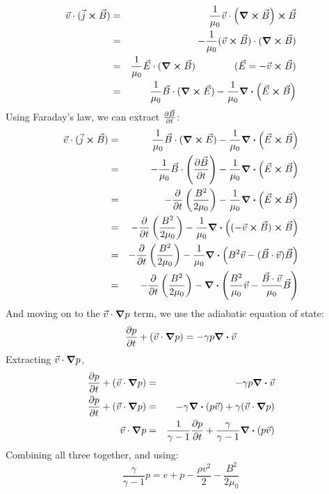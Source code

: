 \documentclass[%
 reprint,
 amsmath,amssymb,
 aps,
]{revtex4-2}
\begin{document}
\begin{eqnarray}
\vec v \cdot ( \vec j \cross \vec B) & = & \frac{1}{\mu_0}\vec v \cdot \left( \curl \vec B \right) \cross \vec B \\
& = & - \frac{1}{\mu_0}(\vec v \cross \vec B) \cdot (\curl \vec B) \\
& = & \frac{1}{\mu_0} \vec E \cdot (\curl \vec B) \qquad \qquad (\vec E = - \vec v \cross \vec B) \\
& = & \frac{1}{\mu_0} \vec B \cdot (\curl \vec E) - \frac{1}{\mu_0} \div (\vec E \cross \vec B)
\end{eqnarray}
Using Faraday's law, we can extract $\pdv{\vec B}{t}$:
\begin{eqnarray}
\vec v \cdot (\vec j \cross \vec B) & = & \frac{1}{\mu_0} \vec B \cdot (\curl \vec E) - \frac{1}{\mu_0} \div (\vec E \cross \vec B) \\
& = & - \frac{1}{\mu_0} \vec B \cdot \left(\pdv{\vec B}{t} \right) - \frac{1}{\mu_0} \div (\vec E \cross \vec B) \\
& = & - \pdv{}{t} \left( \frac{B^2}{2 \mu_0} \right) - \frac{1}{\mu_0} \div (\vec E \cross \vec B) \\
& = & - \pdv{}{t} \left( \frac{B^2}{2 \mu_0} \right) - \frac{1}{\mu_0}\div \left( (- \vec v \cross \vec B) \cross \vec B \right) \\
& = & - \pdv{}{t} \left( \frac{B^2}{2 \mu_0} \right) - \frac{1}{\mu_0} \div \left( B^2 \vec v - (\vec B \cdot \vec v) \vec B \right) \\
& = & - \pdv{}{t} \left( \frac{B^2}{2 \mu_0} \right) - \div \left( \frac{B^2}{\mu_0} \vec v - \frac{\vec B \cdot \vec v}{\mu_0} \vec B \right)
\end{eqnarray}
And moving on to the $\vec v \cdot \grad p$ term, we use the adiabatic equation of state:
\begin{equation}
\pdv{p}{t} + ( \vec v \cdot \grad p) = - \gamma p \div \vec v
\end{equation}
Extracting $\vec v \cdot \grad p$,
\begin{eqnarray}
\pdv{p}{t} + ( \vec v \cdot \grad p) & = & - \gamma p \div \vec v \\
\pdv{p}{t} + ( \vec v \cdot \grad p) & = & - \gamma \div (p \vec v) + \gamma(\vec v \cdot \grad p) \\
\vec v \cdot \grad p & = & \frac{1}{\gamma - 1} \pdv{p}{t}  + \frac{\gamma}{\gamma - 1} \div (p \vec v)
\end{eqnarray}
Combining all three together, and using:
\begin{equation}
\frac{\gamma}{\gamma - 1} p = e + p - \frac{\rho v^2}{2} - \frac{B^2}{2 \mu_0}
\end{equation}
\end{document}
